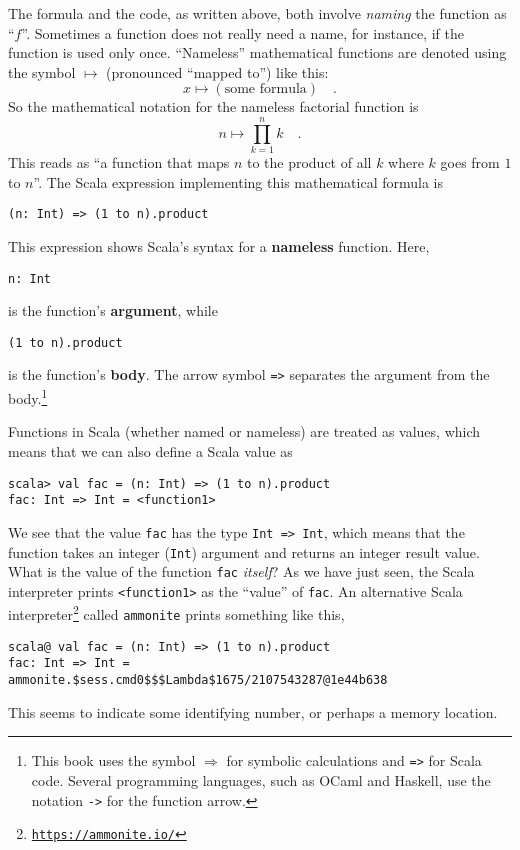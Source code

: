 The formula and the code, as written above, both involve \emph{naming}
the function as ``$f$''. Sometimes a function does not really need
a name, \textendash{} for instance, if the function is used only once.
``Nameless'' mathematical functions are denoted using the symbol
$\mapsto$ (pronounced ``mapped to'') like this: 
\[
x\mapsto\left(\text{some formula}\right)\quad.
\]
So the mathematical notation for the nameless factorial function is
\[
n\mapsto\prod_{k=1}^{n}k\quad.
\]
This reads as ``a function that maps $n$ to the product of all $k$
where $k$ goes from $1$ to $n$''. The Scala expression implementing
this mathematical formula is
\begin{lstlisting}
(n: Int) => (1 to n).product
\end{lstlisting}
This expression shows Scala's syntax for a \textbf{nameless}
function. Here, 
\begin{lstlisting}
n: Int
\end{lstlisting}
is the function's \textbf{argument}, while
\begin{lstlisting}
(1 to n).product
\end{lstlisting}
is the function's \textbf{body}. The arrow symbol \lstinline!=>!
separates the argument from the body.\footnote{This book uses the symbol $\Rightarrow$ for symbolic calculations
and \lstinline!=>! for Scala code. Several programming languages,
such as OCaml and Haskell, use the notation \lstinline!->! for the
function arrow.} 

Functions in Scala (whether named or nameless) are treated as values,
which means that we can also define a Scala value as
\begin{lstlisting}
scala> val fac = (n: Int) => (1 to n).product
fac: Int => Int = <function1>
\end{lstlisting}
We see that the value \lstinline!fac! has the type \lstinline!Int => Int!,
which means that the function takes an integer (\lstinline!Int!)
argument and returns an integer result value. What is the value of
the function \lstinline!fac! \emph{itself}? As we have just seen,
the Scala interpreter prints \lstinline!<function1>! as the ``value''
of \lstinline!fac!. An alternative Scala interpreter\footnote{\texttt{\href{https://ammonite.io/}{https://ammonite.io/}}}
called \texttt{ammonite} prints something like this,
\begin{lstlisting}
scala@ val fac = (n: Int) => (1 to n).product
fac: Int => Int = ammonite.$sess.cmd0$$$Lambda$1675/2107543287@1e44b638
\end{lstlisting}
This seems to indicate some identifying number, or perhaps a memory
location.

